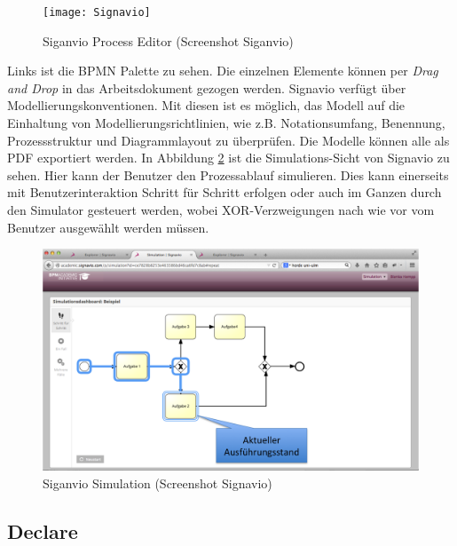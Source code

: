 \begin{figure}[H]
\begin{center}
  \texttt{[image: Signavio]} %
  \caption{Siganvio Process Editor (Screenshot Siganvio)}
  \label{fig:Signavio}
\end{center}
\end{figure} 

Links ist die BPMN Palette zu sehen. Die einzelnen Elemente können per \textit{Drag and Drop} in das Arbeitsdokument gezogen werden. Signavio verfügt über Modellierungskonventionen. Mit diesen ist es  möglich, das Modell auf die Einhaltung von Modellierungsrichtlinien, wie z.B. Notationsumfang, Benennung, Prozessstruktur und Diagrammlayout zu überprüfen. Die Modelle können alle als PDF exportiert werden. \newline
In Abbildung \ref{fig:Simulation} ist die Simulations-Sicht von Signavio zu sehen. Hier kann der Benutzer den Prozessablauf simulieren. Dies kann einerseits mit Benutzerinteraktion Schritt für Schritt erfolgen oder auch im Ganzen durch den Simulator gesteuert werden, wobei XOR-Verzweigungen nach wie vor vom Benutzer ausgewählt werden müssen.
\begin{figure}[H]
\begin{center}
  \includegraphics[scale=0.6]{Simulation} %
  \caption{Siganvio Simulation (Screenshot Signavio)}
  \label{fig:Simulation}
\end{center}
\end{figure} 



\subsection{Declare}

